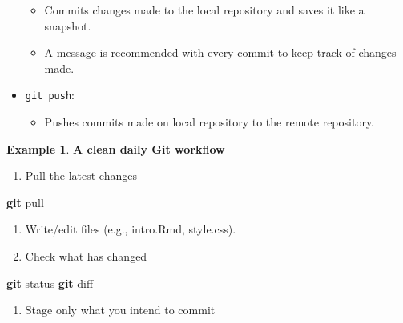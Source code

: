 \documentclass[
]{book}
\newenvironment{Shaded}{\begin{snugshade}}{\end{snugshade}}
\newcommand{\FunctionTok}[1]{\textcolor[rgb]{0.13,0.29,0.53}{\textbf{#1}}}
\newcommand{\NormalTok}[1]{#1}
\providecommand{\tightlist}{%
  \setlength{\itemsep}{0pt}\setlength{\parskip}{0pt}}
\theoremstyle{definition}
\theoremstyle{definition}
\newtheorem{example}{Example}[chapter]
\theoremstyle{definition}
\theoremstyle{definition}
\theoremstyle{remark}
\begin{document}
\begin{itemize}
  \begin{itemize}
  \tightlist
  \item
    Commits changes made to the local repository and saves it like a snapshot.
  \item
    A message is recommended with every commit to keep track of changes made.
  \end{itemize}
\item
  \texttt{git\ push}:

  \begin{itemize}
  \tightlist
  \item
    Pushes commits made on local repository to the remote repository.
  \end{itemize}
\end{itemize}

\begin{example}

\textbf{A clean daily Git workflow}

\begin{enumerate}
\def\labelenumi{\arabic{enumi}.}
\tightlist
\item
  Pull the latest changes
\end{enumerate}

\begin{Shaded}
\begin{Highlighting}[]
\FunctionTok{git}\NormalTok{ pull}
\end{Highlighting}
\end{Shaded}

\begin{enumerate}
\def\labelenumi{\arabic{enumi}.}
\setcounter{enumi}{1}
\item
  Write/edit files (e.g., intro.Rmd, style.css).
\item
  Check what has changed
\end{enumerate}

\begin{Shaded}
\begin{Highlighting}[]
\FunctionTok{git}\NormalTok{ status}
\FunctionTok{git}\NormalTok{ diff}
\end{Highlighting}
\end{Shaded}

\begin{enumerate}
\def\labelenumi{\arabic{enumi}.}
\setcounter{enumi}{3}
\tightlist
\item
  Stage only what you intend to commit
\end{enumerate}


\end{example}
\end{document}
